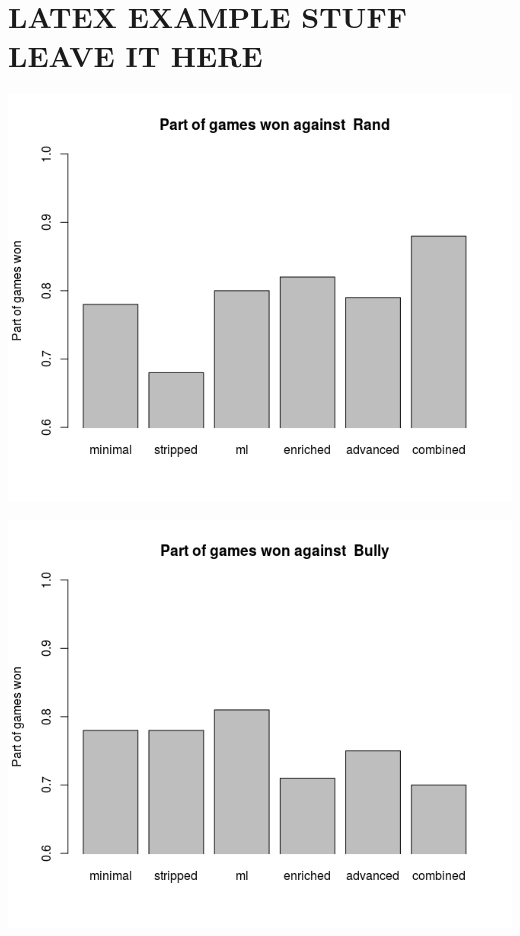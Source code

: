 \documentclass[a4paper,11pt]{article}
\begin{document}
\section*{LATEX EXAMPLE STUFF LEAVE IT HERE}


\begin{center}
\begin{minipage}{0.49\linewidth}
\includegraphics[width=\linewidth]{images/barplotRand.png}
\end{minipage}
\hfill
\begin{minipage}{0.49\linewidth}
\includegraphics[width=\linewidth]{images/barplotBully.png}

\end{minipage}
\end{center}
\end{document}
